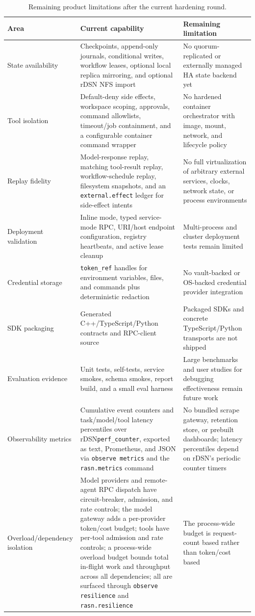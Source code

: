 \documentclass[manuscript,screen,review]{acmart}
\newcommand{\rdsn}{rDSN\xspace}
\begin{document}
\begin{table}[t]
\caption{Remaining product limitations after the current hardening round.}
\label{tab:remaining-gaps}
\centering
\begin{tabular}{p{}p{}p{}}
\toprule
Area & Current capability & Remaining limitation \\
\midrule
State availability & Checkpoints, append-only journals, conditional writes,
workflow leases, optional local replica mirroring, and optional \rdsn NFS import
& No quorum-replicated or externally managed HA state backend yet \\
Tool isolation & Default-deny side effects, workspace scoping, approvals,
command allowlists, timeout/job containment, and a configurable container
command wrapper & No hardened container orchestrator with image, mount,
network, and lifecycle policy \\
Replay fidelity & Model-response replay, matching tool-result replay,
workflow-schedule replay, filesystem snapshots, and an
\texttt{external.effect} ledger for side-effect intents & No full virtualization
of arbitrary external services, clocks, network state, or process environments \\
Deployment validation & Inline mode, typed service-mode RPC, URI/host endpoint
configuration, registry heartbeats, and active lease cleanup & Multi-process and
cluster deployment tests remain limited \\
Credential storage & \texttt{token\_ref} handles for environment variables,
files, and commands plus deterministic redaction & No vault-backed or OS-backed
credential provider integration \\
SDK packaging & Generated C++/TypeScript/Python contracts and RPC-client source
& Packaged SDKs and concrete TypeScript/Python transports are not shipped \\
Evaluation evidence & Unit tests, self-tests, service smokes, schema smokes,
report build, and a small eval harness & Large benchmarks and user studies for
debugging effectiveness remain future work \\
Observability metrics & Cumulative event counters and task/model/tool latency
percentiles over \rdsn \texttt{perf\_counter}, exported as text, Prometheus, and
JSON via \texttt{observe metrics} and the \texttt{rasn.metrics} command & No
bundled scrape gateway, retention store, or prebuilt dashboards; latency
percentiles depend on \rdsn's periodic counter timers \\
Overload/dependency isolation & Model providers and remote-agent RPC dispatch
have circuit-breaker, admission, and rate controls; the model gateway adds a
per-provider token/cost budget; tools have per-tool admission and rate controls; a
process-wide overload budget bounds total in-flight work and throughput across all
dependencies; all are surfaced through
\texttt{observe resilience} and \texttt{rasn.resilience} & The process-wide budget
is request-count based rather than token/cost based \\
\bottomrule
\end{tabular}
\end{table}
\end{document}
